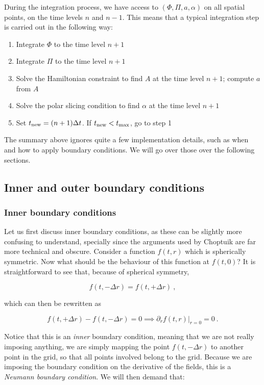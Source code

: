 \documentclass[a4paper,11pt]{article}
\renewcommand{\a}{\alpha}
\newcommand{\pd}{\partial}
\newcommand{\dt}{\Delta t}
\newcommand{\dr}{\Delta r}
\newcommand{\lrpar}[1]{\left( #1 \right)}
\newcommand{\n}{\noindent}
\newcommand{\eq}[1]{
  \begin{equation}
    #1
  \end{equation}
}
\begin{document}
During the integration process, we have access to $\lrpar{\Phi,\Pi,a,\a}$ on all spatial points, on the time levels $n$ and $n-1$. This means that a typical integration step is carried out in the following way:

\begin{enumerate}
\item Integrate $\Phi$ to the time level $n+1$
\item Integrate $\Pi$ to the time level $n+1$
\item Solve the Hamiltonian constraint to find $A$ at the time level $n+1$; compute $a$ from $A$
\item Solve the polar slicing condition to find $\a$ at the time level $n+1$
\item Set $t_{\rm new} = (n+1)\dt$. If $t_{\rm new}<t_{\max}$, go to step 1
\end{enumerate}

The summary above ignores quite a few implementation details, such as when and how to apply boundary conditions. We will go over those over the following sections.

\subsection{Inner and outer boundary conditions}

\subsubsection{Inner boundary conditions}

Let us first discuss inner boundary conditions, as these can be slightly more confusing to understand, specially since the arguments used by Choptuik are far more technical and obscure. Consider a function $f(t,r)$ which is spherically symmetric. Now what should be the behaviour of this function at $f(t,0)$? It is straightforward to see that, because of spherical symmetry,

\eq{ f\lrpar{t,-\dr} = f\lrpar{t,+\dr}\ , }

\n which can then be rewritten as

\eq{ f\lrpar{t,+\dr} - f\lrpar{t,-\dr} = 0 \implies \left.\pd_{r}f(t,r)\right|_{r=0} = 0\ . }

\n Notice that this is an \emph{inner} boundary condition, meaning that we are not really imposing anything, we are simply mapping the point $f\lrpar{t,-\dr}$ to another point in the grid, so that all points involved belong to the grid. Because we are imposing the boundary condition on the derivative of the fields, this is a \emph{Neumann boundary condition}. We will then demand that:
\end{document}
